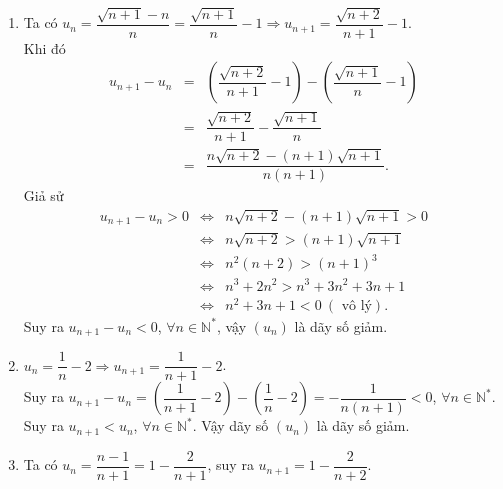 \begin{ex}
{\begin{enumerate}
			 Khi đó
			 \allowdisplaybreaks
			\begin{eqnarray*}
				u_{n+1}-u_n&=&\dfrac{n+1}{n^2+2n+2}-\dfrac{n}{n^2+1}\\ 
				&=&\dfrac{(n+1)\left(n^2+1\right)-n\left(n^2+2n+2\right)}{\left(n^2+1\right)\left(n^2+2n+2\right)}\\ 
				&=&\dfrac{n^3+n^2+n+1-n^3-2n^2-2n}{\left(n^2+1\right)\left(n^2+2n+2\right)}\\ 
				&=&\dfrac{-n^2-n+1}{\left(n^2+1\right)\left(n^2+2n+2\right)} < 0,\forall n  \geq 1.
			\end{eqnarray*}
			Vậy $(u_n)$ là dãy  số giảm.
			\item Ta có $u_n=\dfrac{\sqrt{n+1}-n}{n}=\dfrac{\sqrt{n+1}}{n}-1 \Rightarrow u_{n+1}=\dfrac{\sqrt{n+2}}{n+1}-1$.\\ 
			Khi đó \allowdisplaybreaks 
			\begin{eqnarray*}
				u_{n+1}-u_n&=&\left(\dfrac{\sqrt{n+2}}{n+1}-1\right)-\left(\dfrac{\sqrt{n+1}}{n}-1\right)\\ 
				 &=&\dfrac{\sqrt{n+2}}{n+1}-\dfrac{\sqrt{n+1}}{n}\\
				&=&\dfrac{n \sqrt{n+2}-(n+1)  \sqrt{n+1}}{n(n+1)}.
			\end{eqnarray*}
			 Giả sử
			\allowdisplaybreaks 
			\begin{eqnarray*}
				u_{n+1}-u_n>0 &\Leftrightarrow&  n \sqrt{n+2}-(n+1) \sqrt{n+1}>0\\
				& \Leftrightarrow&  n \sqrt{n+2}>(n+1) \sqrt{n+1}\\
				&\Leftrightarrow&  n^2(n+2)>(n+1)^3\\
				& \Leftrightarrow& n^3+2 n^2>n^3+3 n^2+3 n+1\\ &\Leftrightarrow &n^2+3  n+1<0 ~(\text { vô lý}).
			\end{eqnarray*}
			Suy ra $u_{n+1}-u_n<0$, $\forall n\in\mathbb{N}^*$,  vậy $\left(u_n\right)$ là dãy số giảm.
			 \item $u_n=\dfrac{1}{n}-2 \Rightarrow u_{n+1}=\dfrac{1}{n+1}-2$.\\
			 Suy ra $u_{n+1}-u_n=\left(\dfrac{1}{n+1}-2\right)-\left(\dfrac{1}{n}-2\right)=-\dfrac{1}{n(n+1)}<0$, $\forall n\in\mathbb{N}^*$.\\
			Suy ra $u_{n+1}<u_n$, $\forall  n\in\mathbb{N}^*$. Vậy dãy số $\left(u_n\right)$ là dãy số giảm.
			\item Ta có $u_n=\dfrac{n-1}{n+1}=1-\dfrac{2}{n+1}$, suy ra $u_{n+1}=1-\dfrac{2}{n+2}$.\\ 
			 \allowdisplaybreaks
			\begin{eqnarray*}

\end{eqnarray*}
\end{enumerate}}
\end{ex}
